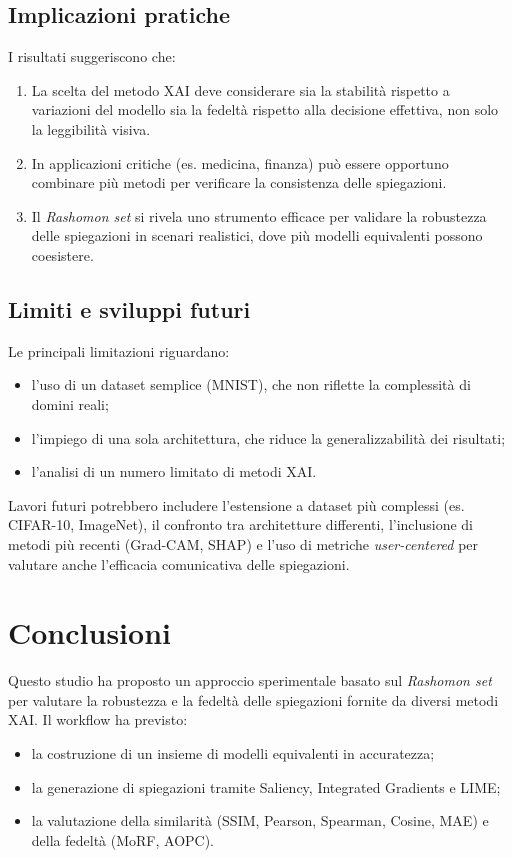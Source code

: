 \documentclass[12pt,a4paper,oneside]{report}
\numberwithin{figure}{chapter}
\numberwithin{table}{chapter}
\begin{document}
\section{Implicazioni pratiche}
I risultati suggeriscono che:
\begin{enumerate}
      \item La scelta del metodo XAI deve considerare sia la stabilità rispetto a
            variazioni del modello sia la fedeltà rispetto alla decisione effettiva, non
            solo la leggibilità visiva.
      \item In applicazioni critiche (es. medicina, finanza) può essere opportuno combinare
            più metodi per verificare la consistenza delle spiegazioni.
      \item Il \emph{Rashomon set} si rivela uno strumento efficace per validare la
            robustezza delle spiegazioni in scenari realistici, dove più modelli
            equivalenti possono coesistere.
\end{enumerate}

\section{Limiti e sviluppi futuri}
Le principali limitazioni riguardano:
\begin{itemize}
      \item l’uso di un dataset semplice (MNIST), che non riflette la complessità di domini
            reali;
      \item l’impiego di una sola architettura, che riduce la generalizzabilità dei
            risultati;
      \item l’analisi di un numero limitato di metodi XAI.
\end{itemize}

Lavori futuri potrebbero includere l’estensione a dataset più complessi (es.
CIFAR-10, ImageNet), il confronto tra architetture differenti, l’inclusione di
metodi più recenti (Grad-CAM, SHAP) e l’uso di metriche \emph{user-centered}
per valutare anche l’efficacia comunicativa delle spiegazioni.

\chapter*{Conclusioni}

Questo studio ha proposto un approccio sperimentale basato sul \emph{Rashomon
      set} per valutare la robustezza e la fedeltà delle spiegazioni fornite da
diversi metodi XAI. Il workflow ha previsto:
\begin{itemize}
      \item la costruzione di un insieme di modelli equivalenti in accuratezza;
      \item la generazione di spiegazioni tramite Saliency, Integrated Gradients e LIME;
      \item la valutazione della similarità (SSIM, Pearson, Spearman, Cosine, MAE) e della
            fedeltà (MoRF, AOPC).
\end{itemize}
\end{document}
